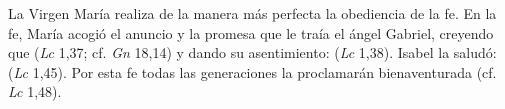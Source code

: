 	
	 La Virgen María realiza de la manera más perfecta la obediencia de la fe. En la fe, María acogió el anuncio y la promesa que le traía el ángel Gabriel, creyendo que  (\emph{Lc} 1,37; cf. \emph{Gn} 18,14) y dando su asentimiento:  (\emph{Lc} 1,38). Isabel la saludó:  (\emph{Lc} 1,45). Por esta fe todas las generaciones la proclamarán bienaventurada (cf. \emph{Lc} 1,48).